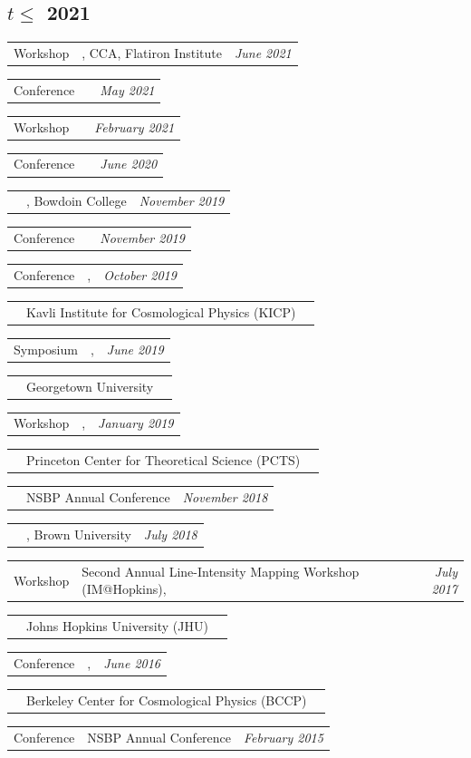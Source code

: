 \documentclass[10pt,a4paper, roman]{moderncv}
\makeatletter
\renewcommand*{\cvitemwithcomment}[3]{%
\parbox{\textwidth}{%
\begin{tabularx}{\textwidth}{@{} p{1.0in} X r @{}} #1 & #2 & \textit{#3} \end{tabularx}%
}%
}
\newcommand{\chref}[3][mutedblue]{\href{#2}{\color{#1}{#3}}}
\newcommand{\chrefccs}[2]{\chref[mutedred]{https://cyril-creque.github.io/files/#1}{#2}}
\makeatother
\begin{document}
\subsection{$t\leq$ 2021}
\cvitemwithcomment{Workshop}{\chref[mutedblue]{https://indico.flatironinstitute.org/event/2504/}{NeXus Workshop}, CCA, Flatiron Institute}{June 2021}
\cvitemwithcomment{Conference}{\chref[mutedblue]{https://indico.cern.ch/event/982783/}{Phenomenology 2021}}{May 2021}
\cvitemwithcomment{Workshop}{\chref[mutedblue]{https://agenda.infn.it/event/24250/}{XIX International Workshop on Neutrino Telescopes}}{February 2021}
\cvitemwithcomment{Conference}{\chref[mutedblue]{https://conferences.fnal.gov/nu2020/}{Neutrino\ 2020}}{June 2020}
\cvitemwithcomment{\chrefccs{talks/EDGES_DM_2019.pdf}{Seminar*}}{\chref[mutedblue]{https://www.bowdoin.edu/physics/news-events/past-events/index.html}{Physics Seminar}, Bowdoin College}{November 2019}
\cvitemwithcomment{Conference}{\chref[mutedblue]{https://www.brown.edu/news/2019-11-13/nsbp}{NSBP Annual Conference}}{November 2019}
\cvitemwithcomment{Conference}{\chref[mutedblue]{https://voices.uchicago.edu/cosmiccontroversies/}{Cosmic Controversies}, }{October 2019}
\cvitemwithcomment{}{Kavli Institute  for Cosmological Physics (KICP)}{}
\cvitemwithcomment{Symposium}{\chref[mutedblue]{https://sites.google.com/georgetown.edu/verarubinsymposium/home}{Symposium in Honor of the Legacy of Vera Rubin}, }{June 2019}
\cvitemwithcomment{}{Georgetown University}{}
\cvitemwithcomment{Workshop}{\chref[mutedblue]{https://pcts.princeton.edu/events/2019/novel-ideas-dark-matter-2019}{Novel Ideas for Dark Matter}, }{January 2019}
\cvitemwithcomment{}{Princeton Center for Theoretical Science (PCTS)}{}
\cvitemwithcomment{\chrefccs{talks/IDM_IM_2018.pdf}{Conference}}{NSBP Annual Conference}{November 2018}
\cvitemwithcomment{\chrefccs{talks/IDM_IM_2018.pdf}{Conference}}{\chref[mutedblue]{https://www.brown.edu/conference/IDM2018/conference-events}{Identification of Dark Matter}, Brown University}{July 2018}
\cvitemwithcomment{Workshop}{Second Annual Line-Intensity Mapping Workshop (IM@Hopkins),}{July 2017}
\cvitemwithcomment{}{Johns Hopkins University (JHU)}{}
\cvitemwithcomment{Conference}{\chref[mutedblue]{http://bccp.berkeley.edu/neutrinocosmology2016/}{Neutrinos \& Light Particles in Cosmology}, }{June 2016}
\cvitemwithcomment{}{Berkeley Center for Cosmological Physics (BCCP)}{}
\cvitemwithcomment{Conference}{NSBP Annual Conference}{February 2015}
\end{document}
